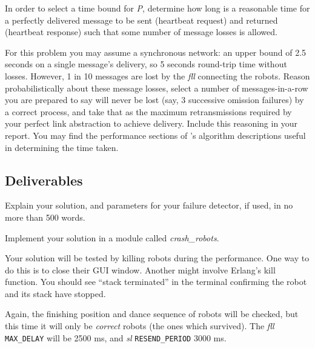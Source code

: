 \documentclass[a4paper]{article}
\begin{document}
In order to select a time bound for \emph{P}, determine how long is a
reasonable time for a perfectly delivered message to be sent (heartbeat
request) and returned (heartbeat response) such that some number of message
losses is allowed.

For this problem you may assume a synchronous network: an upper bound of 2.5
seconds on a single message's delivery, so 5 seconds round-trip time without
losses. However, 1 in 10 messages are lost by the \emph{fll} connecting the
robots. Reason probabilistically about these message losses, select a number
of messages-in-a-row you are prepared to say will never be lost (say, 3
successive omission failures) by a correct process, and take that as the
maximum retransmissions required by your perfect link abstraction to achieve
delivery. Include this reasoning in your report. You may find the performance
sections of \cite{cachin2011}'s algorithm descriptions useful in determining
the time taken.




\subsection*{Deliverables} %
\label{sub:p2_deliverable}

Explain your solution, and parameters for your failure detector, if used, in
no more than 500 words.

Implement your solution in a module called \emph{crash\_robots}.

Your solution will be tested by killing robots during the performance. One way
to do this is to close their GUI window. Another might involve Erlang's kill
function. You should see ``stack terminated'' in the terminal confirming the
robot and its stack have stopped.

Again, the finishing position and dance sequence of robots will be checked,
but this time it will only be \emph{correct} robots (the ones which survived).
The \emph{fll} \verb!MAX_DELAY! will be 2500 ms, and \emph{sl}
\verb!RESEND_PERIOD! 3000 ms.



\end{document}
